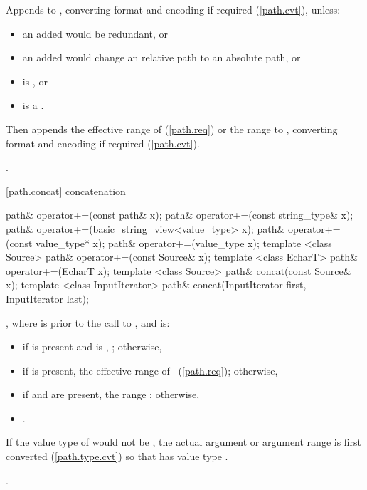 \begin{itemdescr}
\pnum
\effects Appends  to ,
    converting format and encoding if required (\ref{path.cvt}), unless:
\begin{itemize}
\item an added  would be redundant, or
\item an added  would change an relative path to an absolute path, or
\item {} is , or
\item {} is a .
\end{itemize}
Then appends the effective range of  (\ref{path.req})
    or the range  to ,
    converting format and encoding if required (\ref{path.cvt}).

\pnum
\returns {}.
\end{itemdescr}

[path.concat]{ concatenation}

%
%
\begin{itemdecl}
path& operator+=(const path& x);
path& operator+=(const string_type& x);
path& operator+=(basic_string_view<value_type> x);
path& operator+=(const value_type* x);
path& operator+=(value_type x);
template <class Source>
  path& operator+=(const Source& x);
template <class EcharT>
  path& operator+=(EcharT x);
template <class Source>
  path& concat(const Source& x);
template <class InputIterator>
  path& concat(InputIterator first, InputIterator last);
\end{itemdecl}

\begin{itemdescr}
\pnum
\postconditions {},
 where  is  prior to the call to ,
 and  is:
 \begin{itemize}
\item if  is present and is ,
 ; otherwise,
\item if  is present,
 the effective range of ~(\ref{path.req}); otherwise,
\item if  and  are present,
 the range ; otherwise,
\item {}.
\end{itemize}
If the value type of  would not be ,
  the actual argument or argument range is first converted (\ref{path.type.cvt}) so that  has value type .

\pnum
\returns {}.
\end{itemdescr}

